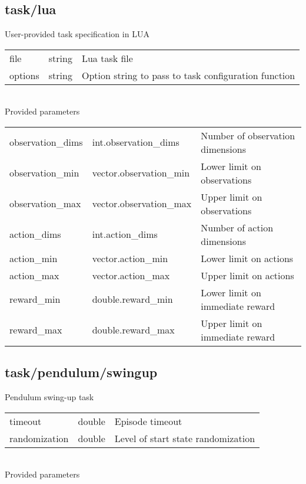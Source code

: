\subsection{task/lua}
\noindent User-provided task specification in LUA\\

\noindent\begin{tabular}{@{}lll@{}}
file&string&Lua task file\\
options&string&Option string to pass to task configuration function\\
\end{tabular}
\\

\noindent Provided parameters\\

\noindent\begin{tabular}{@{}lll@{}}
observation\_dims&int.observation\_dims&Number of observation dimensions\\
observation\_min&vector.observation\_min&Lower limit on observations\\
observation\_max&vector.observation\_max&Upper limit on observations\\
action\_dims&int.action\_dims&Number of action dimensions\\
action\_min&vector.action\_min&Lower limit on actions\\
action\_max&vector.action\_max&Upper limit on actions\\
reward\_min&double.reward\_min&Lower limit on immediate reward\\
reward\_max&double.reward\_max&Upper limit on immediate reward\\
\end{tabular}
\subsection{task/pendulum/swingup}
\noindent Pendulum swing-up task\\

\noindent\begin{tabular}{@{}lll@{}}
timeout&double&Episode timeout\\
randomization&double&Level of start state randomization\\
\end{tabular}
\\

\noindent Provided parameters\\

